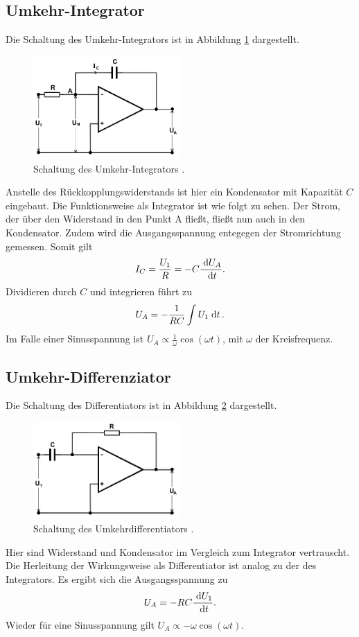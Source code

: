 \subsection{Umkehr-Integrator}
\label{sec:int}
Die Schaltung des Umkehr-Integrators ist in
Abbildung \ref{pic:umInt} dargestellt. 
\begin{figure}[t]
 \includegraphics[width = 0.5\textwidth]{../pics/umkehrInt.png}
 \caption{Schaltung des Umkehr-Integrators \cite{Anl}.}
 \label{pic:umInt}
\end{figure}
Anstelle des Rückkopplungswiderstands ist hier ein Kondensator mit Kapazität $C$ eingebaut. Die Funktionsweise als Integrator ist
wie folgt zu sehen.
Der Strom, der über den Widerstand in den
Punkt A fließt, fließt nun auch in den Kondensator. Zudem wird die Ausgangsspannung
entegegen der Stromrichtung gemessen. Somit
gilt
\begin{align}
 I_C = \frac{U_1}{R} = -C \frac{\; \mathrm{d} U_A}{\; \mathrm{d} t}.
\end{align}
Dividieren durch $C$ und integrieren führt zu
\begin{align}
 U_A = -\frac{1}{RC} \int U_1 \; \mathrm{d} t\,.
\end{align}
Im Falle einer Sinusspannung ist $U_A\propto \frac{1}{\omega} \cos(\omega t)$,
mit $\omega$ der Kreisfrequenz.

\subsection{Umkehr-Differenziator}
\label{sec:diff}
Die Schaltung des Differentiators ist in Abbildung \ref{pic:umDiff}
dargestellt.
\begin{figure}[t]
 \includegraphics[width = 0.5\textwidth]{../pics/umkehrDiff.png}
 \caption{Schaltung des Umkehrdifferentiators \cite{Anl}.}
 \label{pic:umDiff}
\end{figure}
Hier sind Widerstand 
und Kondensator im Vergleich zum
Integrator vertrauscht. Die Herleitung der Wirkungsweise 
als Differentiator ist analog zu der
des Integrators. Es ergibt sich die Ausgangsspannung zu
\begin{align}
 U_A = -RC \frac{\; \mathrm{d} U_1}{\; \mathrm{d} t}.
\end{align}
Wieder für eine Sinusspannung gilt $U_A\propto -\omega \cos(\omega t)$.

